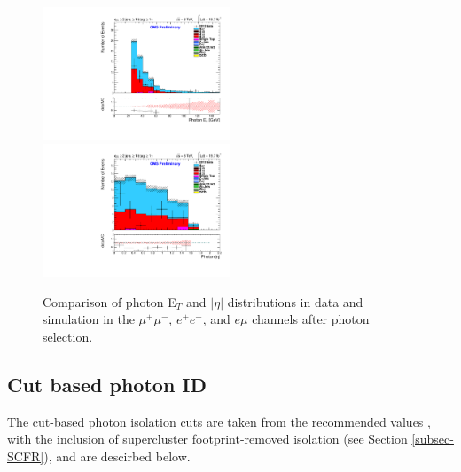 \begin{figure}
\includegraphics[width=0.5\textwidth]{Plots/ControlPlots/TTbarPhotonAnalysis/EMu/Photons/SignalPhotons/Photon_ET_splitTTbar_ratio.pdf}
\includegraphics[width=0.5\textwidth]{Plots/ControlPlots/TTbarPhotonAnalysis/EMu/Photons/SignalPhotons/Photon_AbsEta_splitTTbar_ratio.pdf} 
\caption{Comparison of photon E$_{T}$ and $|\eta|$ distributions in data and simulation in the $\mu^{+}\mu^{-}$, $e^{+}e^{-}$, and $e\mu$ channels after photon selection.}
\label{fig-photonSelectionETandEta}
\end{figure}

\subsection{Cut based photon ID}

The cut-based photon isolation cuts are taken from the recommended values \cite{CutBasedIsolation2012}, with the inclusion of supercluster footprint-removed isolation (see Section \ref{subsec-SCFR}), and are descirbed below.


